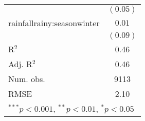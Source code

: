\begin{table}
\begin{center}
\begin{tabular}{l c }
                                  & $(0.05)$      \\
rainfallrainy:seasonwinter        & $0.01$        \\
                                  & $(0.09)$      \\
\hline
R$^2$                             & 0.46          \\
Adj. R$^2$                        & 0.46          \\
Num. obs.                         & 9113          \\
RMSE                              & 2.10          \\
\hline
\multicolumn{2}{l}{\scriptsize{$^{***}p<0.001$, $^{**}p<0.01$, $^*p<0.05$}}
\end{tabular}
\label{table:soil_moisture_model}
\end{center}
\end{table}
